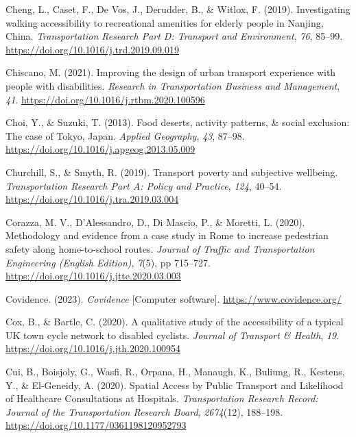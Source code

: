 \documentclass[
  letterpaper,
  DIV=11,
  numbers=noendperiod]{scrartcl}
\newlength{\cslhangindent}
\newenvironment{CSLReferences}[2] %
 {\begin{list}{}{%
  \setlength{\itemindent}{0pt}
  \setlength{\leftmargin}{0pt}
  \setlength{\parsep}{0pt}
  \ifodd #1
   \setlength{\leftmargin}{\cslhangindent}
   \setlength{\itemindent}{-1\cslhangindent}
  \fi
  \setlength{\itemsep}{#2\baselineskip}}}
 {\end{list}}
\begin{document}
\begin{CSLReferences}{1}{0}
Cheng, L., Caset, F., De Vos, J., Derudder, B., \& Witlox, F. (2019).
Investigating walking accessibility to recreational amenities for
elderly people in {Nanjing}, {China}. \emph{Transportation Research Part
D: Transport and Environment}, \emph{76}, 85--99.
\url{https://doi.org/10.1016/j.trd.2019.09.019}

Chiscano, M. (2021). Improving the design of urban transport experience
with people with disabilities. \emph{Research in Transportation Business
and Management}, \emph{41}.
\url{https://doi.org/10.1016/j.rtbm.2020.100596}

Choi, Y., \& Suzuki, T. (2013). Food deserts, activity patterns, \&
social exclusion: {The} case of {Tokyo}, {Japan}. \emph{Applied
Geography}, \emph{43}, 87--98.
\url{https://doi.org/10.1016/j.apgeog.2013.05.009}

Churchill, S., \& Smyth, R. (2019). Transport poverty and subjective
wellbeing. \emph{Transportation Research Part A: Policy and Practice},
\emph{124}, 40--54. \url{https://doi.org/10.1016/j.tra.2019.03.004}

Corazza, M. V., D'Alessandro, D., Di Mascio, P., \& Moretti, L. (2020).
Methodology and evidence from a case study in {Rome} to increase
pedestrian safety along home-to-school routes. \emph{Journal of Traffic
and Transportation Engineering (English Edition)}, \emph{7}(5), pp
715--727. \url{https://doi.org/10.1016/j.jtte.2020.03.003}

Covidence. (2023). \emph{Covidence} {[}Computer software{]}.
\url{https://www.covidence.org/}

Cox, B., \& Bartle, C. (2020). A qualitative study of the accessibility
of a typical {UK} town cycle network to disabled cyclists. \emph{Journal
of Transport \& Health}, \emph{19}.
\url{https://doi.org/10.1016/j.jth.2020.100954}

Cui, B., Boisjoly, G., Wasfi, R., Orpana, H., Manaugh, K., Buliung, R.,
Kestens, Y., \& El-Geneidy, A. (2020). Spatial {Access} by {Public
Transport} and {Likelihood} of {Healthcare Consultations} at
{Hospitals}. \emph{Transportation Research Record: Journal of the
Transportation Research Board}, \emph{2674}(12), 188--198.
\url{https://doi.org/10.1177/0361198120952793}


\end{CSLReferences}
\end{document}
